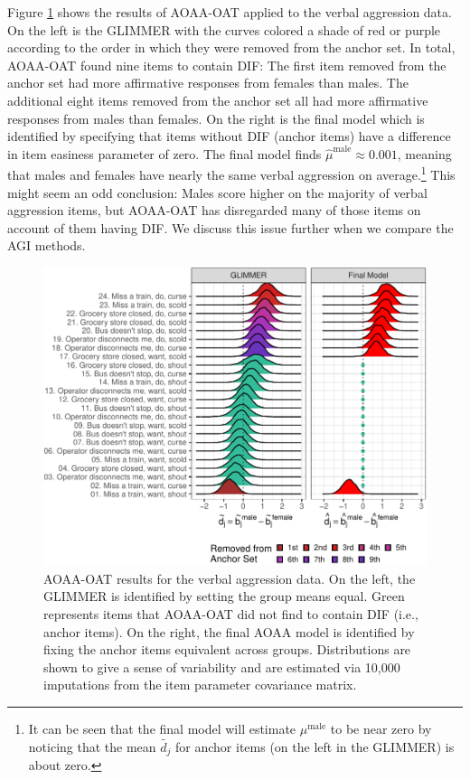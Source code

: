 \documentclass[
  english,
  man,floatsintext]{apa6}
\begin{document}
Figure \ref{fig:aoaaoat} shows the results of AOAA-OAT applied to the verbal aggression data. On the left is the GLIMMER with the curves colored a shade of red or purple according to the order in which they were removed from the anchor set. In total, AOAA-OAT found nine items to contain DIF: The first item removed from the anchor set had more affirmative responses from females than males. The additional eight items removed from the anchor set all had more affirmative responses from males than females. On the right is the final model which is identified by specifying that items without DIF (anchor items) have a difference in item easiness parameter of zero. The final model finds \(\hat \mu^\text{male} \approx 0.001\), meaning that males and females have nearly the same verbal aggression on average.\footnote{It can be seen that the final model will estimate \(\mu^\text{male}\) to be near zero by noticing that the mean \(\tilde {d_j}\) for anchor items (on the left in the GLIMMER) is about zero.} This might seem an odd conclusion: Males score higher on the majority of verbal aggression items, but AOAA-OAT has disregarded many of those items on account of them having DIF. We discuss this issue further when we compare the AGI methods.

\begin{figure}[h]

{\centering \includegraphics{paper_apa_files/figure-latex/aoaaoat-1}

}

\caption{AOAA-OAT results for the verbal aggression data. On the left, the GLIMMER is identified by setting the group means equal. Green represents items that AOAA-OAT did not find to contain DIF (i.e., anchor items). On the right, the final AOAA model is identified by fixing the anchor items equivalent across groups. Distributions are shown to give a sense of variability and are estimated via 10,000 imputations from the item parameter covariance matrix.}\label{fig:aoaaoat}
\end{figure}
\end{document}
